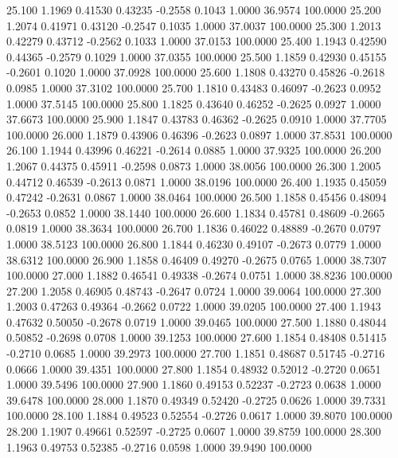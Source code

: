   25.100   1.1969   0.41530   0.43235  -0.2558   0.1043   1.0000  36.9574 100.0000
  25.200   1.2074   0.41971   0.43120  -0.2547   0.1035   1.0000  37.0037 100.0000
  25.300   1.2013   0.42279   0.43712  -0.2562   0.1033   1.0000  37.0153 100.0000
  25.400   1.1943   0.42590   0.44365  -0.2579   0.1029   1.0000  37.0355 100.0000
  25.500   1.1859   0.42930   0.45155  -0.2601   0.1020   1.0000  37.0928 100.0000
  25.600   1.1808   0.43270   0.45826  -0.2618   0.0985   1.0000  37.3102 100.0000
  25.700   1.1810   0.43483   0.46097  -0.2623   0.0952   1.0000  37.5145 100.0000
  25.800   1.1825   0.43640   0.46252  -0.2625   0.0927   1.0000  37.6673 100.0000
  25.900   1.1847   0.43783   0.46362  -0.2625   0.0910   1.0000  37.7705 100.0000
  26.000   1.1879   0.43906   0.46396  -0.2623   0.0897   1.0000  37.8531 100.0000
  26.100   1.1944   0.43996   0.46221  -0.2614   0.0885   1.0000  37.9325 100.0000
  26.200   1.2067   0.44375   0.45911  -0.2598   0.0873   1.0000  38.0056 100.0000
  26.300   1.2005   0.44712   0.46539  -0.2613   0.0871   1.0000  38.0196 100.0000
  26.400   1.1935   0.45059   0.47242  -0.2631   0.0867   1.0000  38.0464 100.0000
  26.500   1.1858   0.45456   0.48094  -0.2653   0.0852   1.0000  38.1440 100.0000
  26.600   1.1834   0.45781   0.48609  -0.2665   0.0819   1.0000  38.3634 100.0000
  26.700   1.1836   0.46022   0.48889  -0.2670   0.0797   1.0000  38.5123 100.0000
  26.800   1.1844   0.46230   0.49107  -0.2673   0.0779   1.0000  38.6312 100.0000
  26.900   1.1858   0.46409   0.49270  -0.2675   0.0765   1.0000  38.7307 100.0000
  27.000   1.1882   0.46541   0.49338  -0.2674   0.0751   1.0000  38.8236 100.0000
  27.200   1.2058   0.46905   0.48743  -0.2647   0.0724   1.0000  39.0064 100.0000
  27.300   1.2003   0.47263   0.49364  -0.2662   0.0722   1.0000  39.0205 100.0000
  27.400   1.1943   0.47632   0.50050  -0.2678   0.0719   1.0000  39.0465 100.0000
  27.500   1.1880   0.48044   0.50852  -0.2698   0.0708   1.0000  39.1253 100.0000
  27.600   1.1854   0.48408   0.51415  -0.2710   0.0685   1.0000  39.2973 100.0000
  27.700   1.1851   0.48687   0.51745  -0.2716   0.0666   1.0000  39.4351 100.0000
  27.800   1.1854   0.48932   0.52012  -0.2720   0.0651   1.0000  39.5496 100.0000
  27.900   1.1860   0.49153   0.52237  -0.2723   0.0638   1.0000  39.6478 100.0000
  28.000   1.1870   0.49349   0.52420  -0.2725   0.0626   1.0000  39.7331 100.0000
  28.100   1.1884   0.49523   0.52554  -0.2726   0.0617   1.0000  39.8070 100.0000
  28.200   1.1907   0.49661   0.52597  -0.2725   0.0607   1.0000  39.8759 100.0000
  28.300   1.1963   0.49753   0.52385  -0.2716   0.0598   1.0000  39.9490 100.0000
